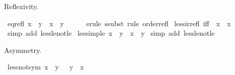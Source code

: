 \begin{isabellebody}
\isamarkupfalse%
%
\endisatagproof
{\isafoldproof}%
%
\isadelimproof
%
\endisadelimproof
%
\begin{isamarkuptext}%
Reflexivity.%
\end{isamarkuptext}\isamarkuptrue%
\isamarkupfalse%
\ eq{\isacharunderscore}{\kern0pt}refl{\isacharcolon}{\kern0pt}\ {\isachardoublequoteopen}x\ {\isacharequal}{\kern0pt}\ y\ {\isasymLongrightarrow}\ x\ {\isasymle}\ y{\isachardoublequoteclose}\isanewline
\ \ \ \ %
\isanewline
%
\isadelimproof
%
\endisadelimproof
%
\isatagproof
{}\isamarkupfalse%
\ {\isacharparenleft}{\kern0pt}erule\ ssubst{\isacharparenright}{\kern0pt}\ {\isacharparenleft}{\kern0pt}rule\ order{\isacharunderscore}{\kern0pt}refl{\isacharparenright}{\kern0pt}%
\endisatagproof
{\isafoldproof}%
%
\isadelimproof
\isanewline
%
\endisadelimproof
\isanewline
{}\isamarkupfalse%
\ less{\isacharunderscore}{\kern0pt}irrefl\ {\isacharbrackleft}{\kern0pt}iff{\isacharbrackright}{\kern0pt}{\isacharcolon}{\kern0pt}\ {\isachardoublequoteopen}{\isasymnot}\ x\ {\isacharless}{\kern0pt}\ x{\isachardoublequoteclose}\isanewline
%
\isadelimproof
%
\endisadelimproof
%
\isatagproof
{}\isamarkupfalse%
\ {\isacharparenleft}{\kern0pt}simp\ add{\isacharcolon}{\kern0pt}\ less{\isacharunderscore}{\kern0pt}le{\isacharunderscore}{\kern0pt}not{\isacharunderscore}{\kern0pt}le{\isacharparenright}{\kern0pt}%
\endisatagproof
{\isafoldproof}%
%
\isadelimproof
\isanewline
%
\endisadelimproof
\isanewline
{}\isamarkupfalse%
\ less{\isacharunderscore}{\kern0pt}imp{\isacharunderscore}{\kern0pt}le{\isacharcolon}{\kern0pt}\ {\isachardoublequoteopen}x\ {\isacharless}{\kern0pt}\ y\ {\isasymLongrightarrow}\ x\ {\isasymle}\ y{\isachardoublequoteclose}\isanewline
%
\isadelimproof
%
\endisadelimproof
%
\isatagproof
{}\isamarkupfalse%
\ {\isacharparenleft}{\kern0pt}simp\ add{\isacharcolon}{\kern0pt}\ less{\isacharunderscore}{\kern0pt}le{\isacharunderscore}{\kern0pt}not{\isacharunderscore}{\kern0pt}le{\isacharparenright}{\kern0pt}%
\endisatagproof
{\isafoldproof}%
%
\isadelimproof
%
\endisadelimproof
%
\begin{isamarkuptext}%
Asymmetry.%
\end{isamarkuptext}\isamarkuptrue%
\isamarkupfalse%
\ less{\isacharunderscore}{\kern0pt}not{\isacharunderscore}{\kern0pt}sym{\isacharcolon}{\kern0pt}\ {\isachardoublequoteopen}x\ {\isacharless}{\kern0pt}\ y\ {\isasymLongrightarrow}\ {\isasymnot}\ {\isacharparenleft}{\kern0pt}y\ {\isacharless}{\kern0pt}\ x{\isacharparenright}{\kern0pt}{\isachardoublequoteclose}\isanewline

\end{isabellebody}
